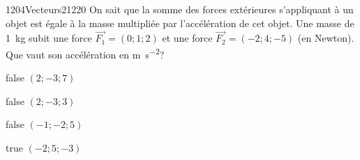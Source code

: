             \begin{question}{1204}{Vecteurs}{2}{1220}
                On sait que la somme des forces extérieures s'appliquant à un objet est égale à la masse multipliée par l'accélération de cet objet. Une masse de \SI{1}{\kilo\gram} subit une force $\vec{F_1}=(0;1;2)$ et une force $\vec{F_2}=(-2;4;-5)$ (en Newton). Que vaut son accélération en \si{\meter\per\second\squared}?
            \end{question}
            \begin{reponses}
                \item[false] $(2;-3;7)$
                \item[false] $(2;-3;3)$
                \item[false] $(-1;-2;5)$
                \item[true] $(-2;5;-3)$
            \end{reponses}
